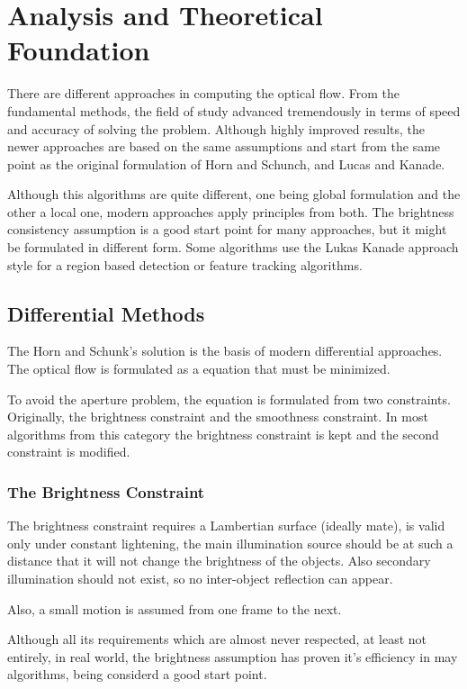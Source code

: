 \documentclass[12pt,a4paper,twoside]{report}
\begin{document}
\chapter{Analysis and Theoretical Foundation}
\label{ch:analysis}

There are different approaches in computing the optical flow. From the fundamental methods, the field of study advanced tremendously in terms of speed and accuracy of solving the problem. Although highly improved results, the newer approaches are based on the same assumptions and start from the same point as the original formulation of Horn and Schunch, and Lucas and Kanade. 

Although this algorithms are quite different, one being global formulation and the other a local one, modern approaches apply principles from both. The brightness consistency assumption is a good start point for many approaches, but it might be formulated in different form. Some algorithms use the Lukas Kanade approach style for a region based detection or feature tracking algorithms.




\section{Differential Methods}
The Horn and Schunk's solution is the basis of modern differential approaches. The optical flow is formulated as a equation that must be minimized.

To avoid the aperture problem, the equation is formulated from two constraints. Originally, the brightness constraint and the smoothness constraint. In most algorithms from this category the brightness constraint is kept and the second constraint is modified.
\subsection{The Brightness Constraint} \label{BrightnessConstr}

The brightness constraint requires a Lambertian surface (ideally mate), is valid only under constant lightening, the main illumination source should be at such a distance that it will not change the brightness of the objects. Also secondary illumination should not exist, so no inter-object reflection can appear.

 Also, a small motion is assumed from one frame to the next. 
 
Although all its  requirements which are almost never respected, at least not entirely, in real world, the brightness assumption has proven it's efficiency in may algorithms, being considerd a good start point.
\end{document}
